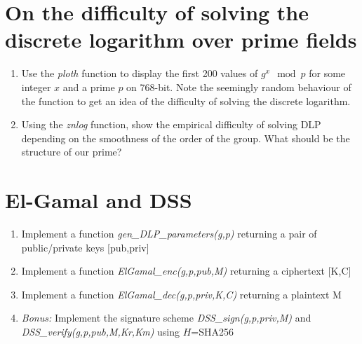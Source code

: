 \documentclass[12pt]{article}
\begin{document}
\section{On the difficulty of solving the discrete logarithm over prime fields}
\begin{enumerate}
	\item Use the {\it ploth} function to display the first 200 values of $g^x \mod p$ for some integer $x$ and a prime $p$ on 768-bit. Note the seemingly random behaviour of the function to get an idea of the difficulty of solving the discrete logarithm.
	\item Using the {\it znlog} function, show the empirical difficulty of solving DLP depending on the smoothness of the order of the group. What should be the structure of our prime?
\end{enumerate}

\section{El-Gamal and DSS}
\begin{enumerate}
	\item Implement a function {\it gen\_DLP\_parameters(g,p)} returning a pair of public/private keys [pub,priv]
	\item Implement a function {\it ElGamal\_enc(g,p,pub,M)} returning a ciphertext [K,C]
	\item Implement a function {\it ElGamal\_dec(g,p,priv,K,C)} returning a plaintext M
	\item {\it Bonus:} Implement the signature scheme {\it DSS\_sign(g,p,priv,M)} and {\it DSS\_verify(g,p,pub,M,Kr,Km)} using $H$=SHA256
\end{enumerate}
\end{document}
